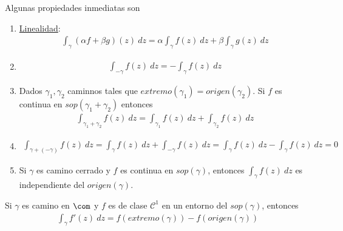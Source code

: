 \begin{obs}
Algunas propiedades inmediatas son
\begin{enumerate}
    \item \underline{Linealidad}:
    \begin{align*}
        \int_{\gamma}{(\alpha f + \beta g)(z) \ dz} = \alpha\int_{\gamma}{f(z) \ dz} + \beta\int_{\gamma}{g(z) \ dz}
    \end{align*}
    \item 
    \begin{align*}
        \int_{-\gamma}{f(z) \ dz} = -\int_{\gamma}{f(z) \ dz}
    \end{align*}
    \item Dados $\gamma_1,\gamma_2$ caminnos tales que $extremo(\gamma_1) = origen(\gamma_2)$. Si $f$ es continua en $sop(\gamma_1 + \gamma_2)$ entonces
    \begin{align*}
        \int_{\gamma_1 + \gamma_2}{f(z) \ dz} = \int_{\gamma_1}{f(z) \ dz} + \int_{\gamma_2}{f(z) \ dz}
    \end{align*}
    \item
        \begin{align*}
        \int_{\gamma + (-\gamma)}{f(z) \ dz} = \int_{\gamma}{f(z) \ dz} + \int_{-\gamma}{f(z) \ dz} = \int_{\gamma}{f(z) \ dz} - \int_{\gamma}{f(z) \ dz} = 0
    \end{align*}
    \item Si $\gamma$ es camino cerrado  y $f$ es continua en $sop(\gamma)$, entonces $\int_{\gamma}{f(z) \ dz}$ es independiente del $origen(\gamma)$.
\end{enumerate}
\end{obs}

\begin{prop}
Si $\gamma$ es camino en $\com$ y $f$ es de clase $\mathscr{C}^1$ en un entorno del $sop(\gamma)$, entonces
\begin{align*}
    \int_{\gamma}{f'(z) \ dz} = f(extremo(\gamma)) - f(origen(\gamma))
\end{align*}
\end{prop}

